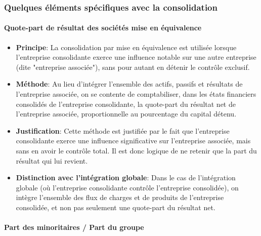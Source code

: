 \documentclass[a4paper, 12pt]{report}
\begin{document}
\subsubsection{Quelques éléments spécifiques avec la consolidation}

\paragraph{Quote-part de résultat des sociétés mise en équivalence}

\begin{itemize}
	\item \textbf{Principe}: La consolidation par mise en équivalence est utilisée lorsque l'entreprise consolidante exerce une influence notable sur une autre entreprise (dite "entreprise associée"), sans pour autant en détenir le contrôle exclusif.
	\item \textbf{Méthode}: Au lieu d'intégrer l'ensemble des actifs, passifs et résultats de l'entreprise associée, on se contente de comptabiliser, dans les états financiers consolidés de l'entreprise consolidante, la quote-part du résultat net de l'entreprise associée, proportionnelle au pourcentage du capital détenu.
	\item \textbf{Justification}: Cette méthode est justifiée par le fait que l'entreprise consolidante exerce une influence significative sur l'entreprise associée, mais sans en avoir le contrôle total. Il est donc logique de ne retenir que la part du résultat qui lui revient.
	\item \textbf{Distinction avec l'intégration globale}: Dans le cas de l'intégration globale (où l'entreprise consolidante contrôle l'entreprise consolidée), on intègre l'ensemble des flux de charges et de produits de l'entreprise consolidée, et non pas seulement une quote-part du résultat net.
\end{itemize}

\paragraph{Part des minoritaires / Part du groupe}
\end{document}
